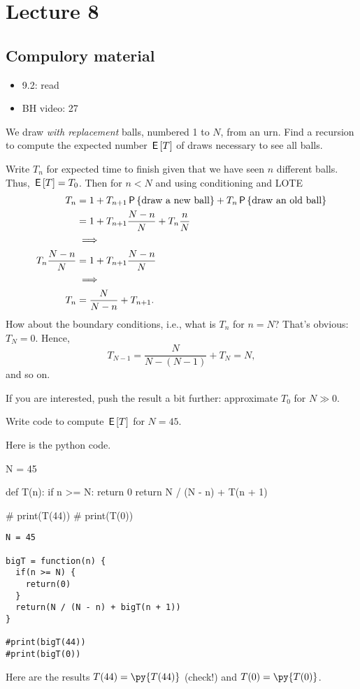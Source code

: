 \section{Lecture 8}


\subsection{Compulory material}
\label{sec:compulory-material}

\begin{itemize}
\item 9.2: read
\item BH video: 27
\end{itemize}


\begin{exercise}
We draw \emph{with replacement} balls, numbered 1 to $N$, from an urn.
Find a recursion to compute the expected number $\E T$ of draws necessary to see all balls.
\begin{solution}
Write $T_{n}$ for expected time to finish given that we have seen $n$ different balls. Thus, $\E T = T_{0}$.
Then for $n< N$ and using conditioning and LOTE
\begin{align}
T_n
&= 1
+T_{n+1} \P{\text{draw a new ball}}
+T_{n} \P{\text{draw an old ball}}  \\
&= 1
+T_{n+1} \frac{N-n}{N}
+T_{n} \frac{n}{N} \\
&\implies\\
T_n \frac{N-n}{N} &= 1 +T_{n+1} \frac{N-n}{N} \\
&\implies \\
T_n &= \frac{N}{N-n}  +T_{n+1}.
\end{align}
How about the boundary conditions, i.e., what is $T_{n}$ for $n=N$?
That's obvious: $T_{N} = 0$. Hence,
\begin{equation}
T_{N-1} = \frac{N}{N-(N-1)} + T_{N} = N,
\end{equation}
and so on.

If you are interested,  push the result a bit further: approximate $T_{0}$ for $N\gg 0$.
\end{solution}
\end{exercise}


\begin{exercise}
Write code to compute $\E T$ for $N=45$.
\begin{solution}
Here is the python code.

\begin{pyblock}
N = 45


def T(n):
    if n >= N:
        return 0
    return N / (N - n) + T(n + 1)

# print(T(44))
# print(T(0))
\end{pyblock}
\begin{verbatim}
N = 45

bigT = function(n) {
  if(n >= N) {
    return(0)
  }
  return(N / (N - n) + bigT(n + 1))
}

#print(bigT(44))
#print(bigT(0))
\end{verbatim}
Here are the results $T(44) = \py{T(44)}$ (check!) and $T(0) = \py{T(0)}$.
\end{solution}
\end{exercise}


